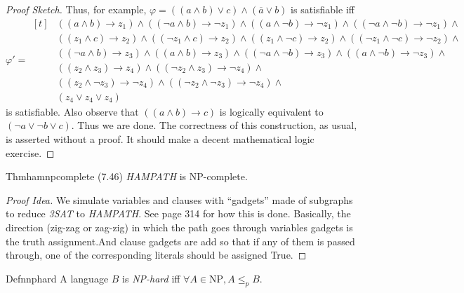 \begin{proof}[Proof Sketch]
  Thus, for example, $\varphi=((a\wedge b)\vee c)\wedge(\overline{a}\vee b)$ is satisfiable iff
  \[
    \varphi' =
    \begin{aligned}[t]
       & ((a \land b) \rightarrow z_1) \land
      ((\lnot a \land b) \rightarrow \lnot z_1) \land
      ((a \land \lnot b) \rightarrow \lnot z_1) \land
      ((\lnot a \land \lnot b) \rightarrow \lnot z_1) \land     \\
       & ((z_1 \land c) \rightarrow z_2) \land
      ((\lnot z_1 \land c) \rightarrow z_2) \land
      ((z_1 \land \lnot c) \rightarrow z_2) \land
      ((\lnot z_1 \land \lnot c) \rightarrow \lnot z_2) \land   \\
       & ((\neg a \land b) \rightarrow z_3) \land
      ((a \land b) \rightarrow z_3) \land
      ((\neg a \land \lnot b) \rightarrow z_3) \land
      ((a \land \lnot b) \rightarrow \lnot z_3) \land           \\
       & ((z_2 \land z_3) \rightarrow z_4) \land
      ((\lnot z_2 \land z_3) \rightarrow \lnot z_4) \land       \\
       &
      ((z_2 \land \lnot z_3) \rightarrow \lnot z_4) \land
      ((\lnot z_2 \land \lnot z_3) \rightarrow \lnot z_4) \land \\
       & (z_4\vee z_4\vee z_4)
    \end{aligned}
  \]
  is satisfiable. Also observe that $((a\wedge b)\to c)$ is logically equivalent to $(\neg a\vee \neg b\vee c)$. Thus we are done. The correctness of this construction, as usual, is asserted without a proof. It should make a decent mathematical logic exercise.
\end{proof}

\begin{reference}{Thm}{hamnpcomplete}
  (7.46) \textit{HAMPATH} is NP-complete.
\end{reference}

\begin{proof}[Proof Idea]
  We simulate variables and clauses with ``gadgets'' made of subgraphs to reduce \textit{3SAT} to \textit{HAMPATH}. See page 314 for how this is done. Basically, the direction (zig-zag or zag-zig) in which the path goes through variables gadgets is the truth assignment.And clause gadgets are add so that if any of them is passed through, one of the corresponding literals should be assigned True.
\end{proof}

\begin{reference}{Defn}{nphard}
  A language $B$ is \emph{NP-hard} iff $\forall A\in \mathrm{NP}, A\leq_p B$.
\end{reference}

